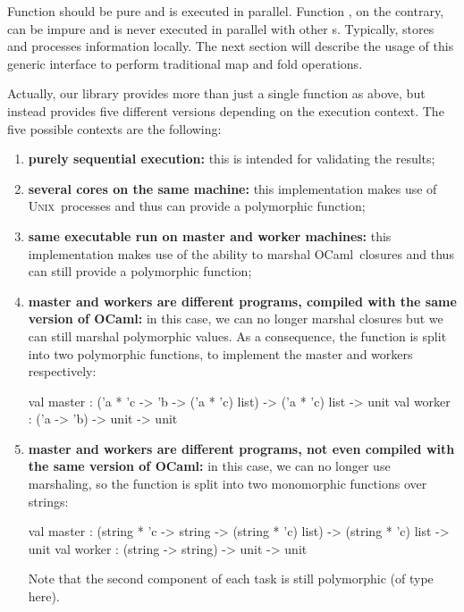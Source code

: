 \documentclass[preprint]{sigplanconf}
\newcommand{\Ocaml}{OCaml}
\newcommand{\unix}{\textsc{Unix}}
\begin{document}
Function  should be pure and is executed in parallel.
Function , on the contrary, can be impure and is never
executed in parallel with other s. Typically,
 stores and processes information locally.
The next section will describe the usage of this generic interface to
perform traditional map and fold operations.

Actually, our library provides more than just a single 
function as above, but instead provides five different versions
depending on the execution context. The five possible contexts are the
following: 
\begin{enumerate}
\item \textbf{purely sequential execution:}
  this is intended for validating the results;

\item \textbf{several cores on the same machine:} 
  this implementation makes use of \unix\ processes and thus can
  provide a polymorphic  function;

\item \textbf{same executable run on master and worker machines:}
  this implementation makes use of the ability to marshal \Ocaml\
  closures and thus can still provide a polymorphic  function;

\item \textbf{master and workers are different programs, compiled with
    the same version of \Ocaml:} 
  in this case, we can no longer marshal closures but we can still
  marshal polymorphic values. As a consequence, 
  the  function is split into two
  polymorphic functions, to implement the master and workers respectively:
  \begin{ocaml}
val master : 
  ('a * 'c -> 'b -> ('a * 'c) list) -> 
  ('a * 'c) list -> unit
val worker : ('a -> 'b) -> unit -> unit
  \end{ocaml}

\item \textbf{master and workers are different programs, not even
    compiled with the same version of \Ocaml:} in this case, we can no
  longer use marshaling, so the
   function is split into two monomorphic functions
  over strings: 
  \begin{ocaml}
val master : 
  (string * 'c -> string -> (string * 'c) list) -> 
  (string * 'c) list -> unit
val worker : (string -> string) -> unit -> unit
  \end{ocaml}
  Note that the second component of each task is still polymorphic (of
  type \ocaml{'c} here).
\end{enumerate}
\end{document}
